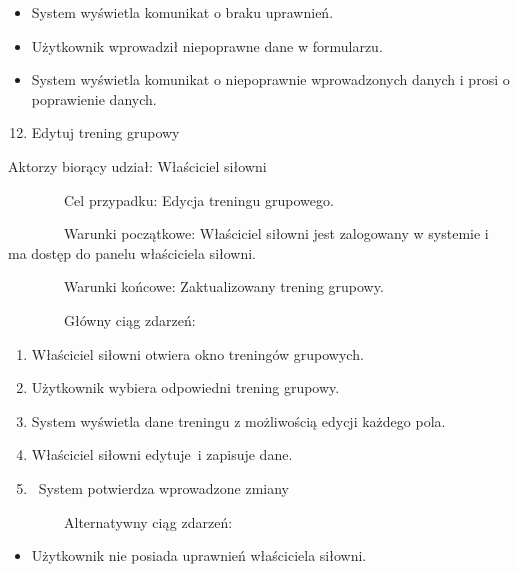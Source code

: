 \documentclass[
]{article}
\providecommand{\tightlist}{%
  \setlength{\itemsep}{0pt}\setlength{\parskip}{0pt}}
\begin{document}
\begin{itemize}
\tightlist
\item
  {System wyświetla komunikat o braku uprawnień.}
\end{itemize}

\begin{itemize}
\tightlist
\item
  {Użytkownik wprowadził niepoprawne dane w formularzu.}
\end{itemize}

\begin{itemize}
\tightlist
\item
  {System wyświetla komunikat o niepoprawnie wprowadzonych danych i
  prosi o poprawienie danych.}
\end{itemize}

{}

\begin{enumerate}
\setcounter{enumi}{11}
\tightlist
\item
  {Edytuj trening grupowy}
\end{enumerate}

{Aktorzy biorący udział: Właściciel siłowni}

{~~~~~~~~Cel przypadku: Edycja treningu grupowego.}

{~~~~~~~~Warunki początkowe: Właściciel siłowni jest zalogowany w
systemie i ma dostęp do panelu właściciela siłowni.}

{~~~~~~~~Warunki końcowe: Zaktualizowany trening grupowy.}

{~~~~~~~~Główny ciąg zdarzeń:}

\begin{enumerate}
\tightlist
\item
  {Właściciel siłowni otwiera okno treningów grupowych.}
\item
  {Użytkownik wybiera odpowiedni trening grupowy.}
\item
  {System wyświetla dane treningu z możliwością edycji każdego pola.}
\item
  {Właściciel siłowni }{edytuje}{~i zapisuje dane.}
\item
  {~System potwierdza wprowadzone zmiany}
\end{enumerate}

{~~~~~~~~Alternatywny ciąg zdarzeń:}

\begin{itemize}
\tightlist
\item
  {Użytkownik nie posiada uprawnień właściciela siłowni.}
\end{itemize}
\end{document}
